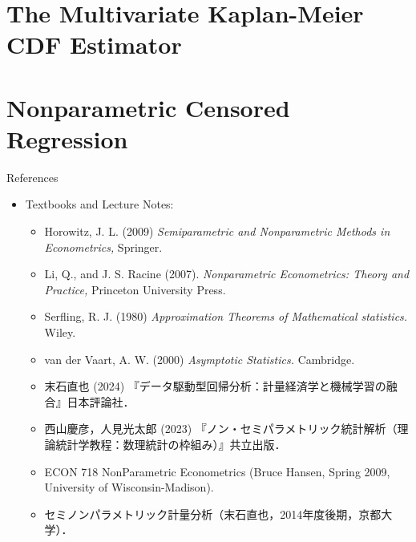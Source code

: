 \documentclass[xcolor=svgnames,dvipdfmx,cjk]{beamer}
\theoremstyle{example}
\begin{document}

\section{The Multivariate Kaplan-Meier CDF Estimator}








\section{Nonparametric Censored Regression}














\begin{frame}{References}
  \begin{itemize}
    \item Textbooks and Lecture Notes:
    \begin{itemize}
      \item Horowitz, J. L. (2009)
            \textit{Semiparametric and Nonparametric Methods in Econometrics,}
            Springer.
      \item Li, Q., and J. S. Racine (2007). 
            \textit{Nonparametric Econometrics: Theory and Practice,} 
            Princeton University Press.
      \item Serfling, R. J. (1980)
            \textit{Approximation Theorems of Mathematical statistics.} Wiley.
      \item van der Vaart, A. W. (2000)
            \textit{Asymptotic Statistics.} Cambridge.
      \item 末石直也 (2024) 『データ駆動型回帰分析：計量経済学と機械学習の融合』日本評論社．
      \item 西山慶彦，人見光太郎 (2023) 『ノン・セミパラメトリック統計解析（理論統計学教程：数理統計の枠組み）』共立出版．
      \item ECON 718 NonParametric Econometrics (Bruce Hansen, Spring 2009, University of Wisconsin-Madison).
      \item セミノンパラメトリック計量分析（末石直也，2014年度後期，京都大学）．
    \end{itemize}
  \end{itemize}
\end{frame}
\end{document}
